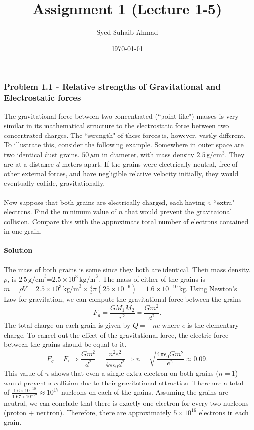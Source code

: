 \documentclass{article}
\title{Assignment \textbf{1} (Lecture 1-5)
}
\author{Syed Suhaib Ahmad}
\date{\today}
\begin{document}
\maketitle


\subsubsection*{Problem 1.1 - Relative strengths of Gravitational and Electrostatic forces}
The gravitational force between two concentrated (“point-like") masses is very similar in its mathematical structure to the electrostatic force between two concentrated charges. The “strength" of these forces is, however, vastly different. To illustrate this, consider the following example. Somewhere in outer space are two identical dust grains, $50\,\mu$m in diameter, with mass density $2.5\,$g/cm$^3$. They are at a distance $d$ meters apart. If the grains were electrically neutral, free of other external forces, and have negligible relative velocity initially, they would eventually collide, gravitationally.
\\
\\Now suppose that both grains are electrically charged, each having $n$ “extra" electrons. Find the minimum value of $n$ that would prevent the gravitaional collision. Compare this with the approximate total number of electrons contained in one grain.
\\
\\\textbf{Solution}
\\
\\The mass of both grains is same since they both are identical. Their mass density, $\rho$, is $2.5\,\text{g/cm}^3$=$2.5\times10^3\,\text{kg/m}^3$. The mass of either of the grains is $m=\rho V=2.5\times10^3\,\text{kg/m}^3\times\frac{4}{3}\pi(25\times10^{-6})=1.6\times10^{-10}\,$kg. Using Newton's Law for gravitation, we can compute the gravitational force between the grains
\[F_g=\frac{GM_1M_2}{r^2}=\frac{Gm^2}{d^2}.\]
The total charge on each grain is given by $Q=-ne$ where $e$ is the elementary charge. To cancel out the effect of the gravitational force, the electric force between the grains should be equal to it.
\[F_g=F_e\Rightarrow\frac{Gm^2}{d^2}=\frac{n^2e^2}{4\pi\epsilon_0d^2}\Rightarrow n=\sqrt{\frac{4\pi\epsilon_0Gm^2}{e^2}}\approx0.09.\]
This value of $n$ shows that even a single extra electron on both grains ($n=1$) would prevent a collision due to their gravitational attraction. There are a total of $\frac{1.6\times10^{-10}}{1.67\times10^{-27}}\approx10^{17}$ nucleons on each of the grains. Assuming the grains are neutral, we can conclude that there is exactly one electron for every two nucleons (proton + neutron). Therefore, there are approximately $5\times10^{16}$ electrons in each grain.
\end{document}

